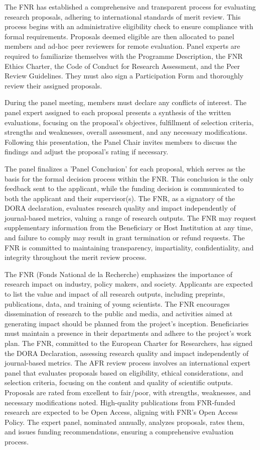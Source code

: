 \documentclass{article}
\begin{document}
The FNR has established a comprehensive and transparent process for evaluating research proposals, adhering to international standards of merit review. This process begins with an administrative eligibility check to ensure compliance with formal requirements. Proposals deemed eligible are then allocated to panel members and ad-hoc peer reviewers for remote evaluation. Panel experts are required to familiarize themselves with the Programme Description, the FNR Ethics Charter, the Code of Conduct for Research Assessment, and the Peer Review Guidelines. They must also sign a Participation Form and thoroughly review their assigned proposals.

During the panel meeting, members must declare any conflicts of interest. The panel expert assigned to each proposal presents a synthesis of the written evaluations, focusing on the proposal's objectives, fulfillment of selection criteria, strengths and weaknesses, overall assessment, and any necessary modifications. Following this presentation, the Panel Chair invites members to discuss the findings and adjust the proposal's rating if necessary.

The panel finalizes a 'Panel Conclusion' for each proposal, which serves as the basis for the formal decision process within the FNR. This conclusion is the only feedback sent to the applicant, while the funding decision is communicated to both the applicant and their supervisor(s). The FNR, as a signatory of the DORA declaration, evaluates research quality and impact independently of journal-based metrics, valuing a range of research outputs. The FNR may request supplementary information from the Beneficiary or Host Institution at any time, and failure to comply may result in grant termination or refund requests. The FNR is committed to maintaining transparency, impartiality, confidentiality, and integrity throughout the merit review process.

The FNR (Fonds National de la Recherche) emphasizes the importance of research impact on industry, policy makers, and society. Applicants are expected to list the value and impact of all research outputs, including preprints, publications, data, and training of young scientists. The FNR encourages dissemination of research to the public and media, and activities aimed at generating impact should be planned from the project's inception. Beneficiaries must maintain a presence in their departments and adhere to the project's work plan. The FNR, committed to the European Charter for Researchers, has signed the DORA Declaration, assessing research quality and impact independently of journal-based metrics. The AFR review process involves an international expert panel that evaluates proposals based on eligibility, ethical considerations, and selection criteria, focusing on the content and quality of scientific outputs. Proposals are rated from excellent to fair/poor, with strengths, weaknesses, and necessary modifications noted. High-quality publications from FNR-funded research are expected to be Open Access, aligning with FNR's Open Access Policy. The expert panel, nominated annually, analyzes proposals, rates them, and issues funding recommendations, ensuring a comprehensive evaluation process.
\end{document}
